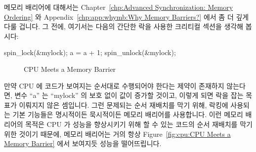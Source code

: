 메모리 배리어에 대해서는
Chapter~\ref{chp:Advanced Synchronization: Memory Ordering} 와
Appendix~\ref{chp:app:whymb:Why Memory Barriers?} 에서 좀 더 깊게 다룰 겁니다.
그 전에, 여기서는 다음의 간단한 락을 사용한 크리티컬 섹션을 생각해 봅시다:

\begin{VerbatimN}
spin_lock(&mylock);
a = a + 1;
spin_unlock(&mylock);
\end{VerbatimN}

\begin{figure}[tb]
\centering
{}
\caption{CPU Meets a Memory Barrier}
\end{figure}

만약 CPU 에 코드가 보여지는 순서대로 수행되어야 한다는 제약이 존재하지
않는다면, 변수 ``a'' 는 ``mylock'' 의 보호 없이 값이 증가할 것이고, 이렇게 되면
락을 잡는 목표가 이뤄지지 않은 셈입니다.
그런 문제되는 순서 재배치를 막기 위해, 락킹에 사용되는 기본 기능들은 명시적이든
묵시적이든 메모리 배리어를 사용합니다.
이런 메모리 배리어의 목적은 CPU 가 성능을 향상시키기 위해 할 수 있는 코드의
순서 재배치를 막기 위한 것이기 때문에, 메모리 배리어는 거의 항상
Figure~\ref{fig:cpu:CPU Meets a Memory Barrier} 에서 보여지듯 성능을
떨어뜨립니다.

